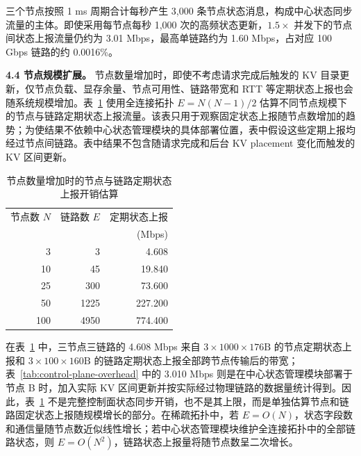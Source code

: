 三个节点按照 1 ms 周期合计每秒产生 3,000 条节点状态消息，构成中心状态同步流量的主体。即使采用每节点每秒 1,000 次的高频状态更新，\(1.5\times\) 并发下的节点间状态上报流量仍约为 3.01 Mbps，最高单链路约为 1.60 Mbps，占对应 100 Gbps 链路的约 0.0016\%。

\textbf{4.4 节点规模扩展。}
节点数量增加时，即使不考虑请求完成后触发的 KV 目录更新，仅节点负载、显存余量、节点可用性、链路带宽和 RTT 等定期状态上报也会随系统规模增加。表~\ref{tab:control-plane-node-scale} 使用全连接拓扑 \(E=N(N-1)/2\) 估算不同节点规模下的节点与链路定期状态上报流量。该表只用于观察固定状态上报随节点数增加的趋势；为使结果不依赖中心状态管理模块的具体部署位置，表中假设这些定期上报均经过节点间链路。表中结果不包含随请求完成和后台 KV placement 变化而触发的 KV 区间更新。

\begin{table}[H]
\centering
\small
\caption{节点数量增加时的节点与链路定期状态上报开销估算}
\label{tab:control-plane-node-scale}
\begin{tabular}{@{}rrr@{}}
\toprule
节点数 \(N\) & 链路数 \(E\) & 定期状态上报 \\
 & & (Mbps) \\
\midrule
3 & 3 & 4.608 \\
10 & 45 & 19.840 \\
25 & 300 & 73.600 \\
50 & 1225 & 227.200 \\
100 & 4950 & 774.400 \\
\bottomrule
\end{tabular}
\end{table}

在表~\ref{tab:control-plane-node-scale} 中，三节点三链路的 4.608 Mbps 来自 \(3\times1000\times176\mathrm{B}\) 的节点定期状态上报和 \(3\times100\times160\mathrm{B}\) 的链路定期状态上报全部跨节点传输后的带宽；表~\ref{tab:control-plane-overhead} 中的 3.010 Mbps 则是在中心状态管理模块部署于节点 B 时，加入实际 KV 区间更新并按实际经过物理链路的数据量统计得到。因此，表~\ref{tab:control-plane-node-scale} 不是完整控制面状态同步开销，也不是其上限，而是单独估算节点和链路固定状态上报随规模增长的部分。在稀疏拓扑中，若 \(E=O(N)\)，状态字段数和通信量随节点数近似线性增长；若中心状态管理模块维护全连接拓扑中的全部链路状态，则 \(E=O(N^2)\)，链路状态上报量将随节点数呈二次增长。

